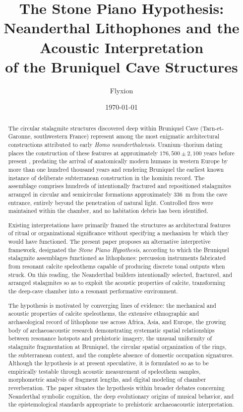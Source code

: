 \documentclass[12pt]{article}
\title{The Stone Piano Hypothesis:\\
Neanderthal Lithophones and the Acoustic Interpretation\\
of the Bruniquel Cave Structures}
\author{Flyxion}
\date{\today}
\begin{document}
\maketitle

\begin{abstract}
The circular stalagmite structures discovered deep within Bruniquel Cave (Tarn-et-Garonne, southwestern France) represent among the most enigmatic architectural constructions attributed to early \textit{Homo neanderthalensis}. Uranium--thorium dating places the construction of these features at approximately $176{,}500 \pm 2{,}100$ years before present \citep{Jaubert2016}, predating the arrival of anatomically modern humans in western Europe by more than one hundred thousand years and rendering Bruniquel the earliest known instance of deliberate subterranean construction in the hominin record. The assemblage comprises hundreds of intentionally fractured and repositioned stalagmites arranged in circular and semicircular formations approximately 336~m from the cave entrance, entirely beyond the penetration of natural light. Controlled fires were maintained within the chamber, and no habitation debris has been identified.

Existing interpretations have primarily framed the structures as architectural features of ritual or organizational significance without specifying a mechanism by which they would have functioned. The present paper proposes an alternative interpretive framework, designated the \textit{Stone Piano Hypothesis}, according to which the Bruniquel stalagmite assemblages functioned as lithophones: percussion instruments fabricated from resonant calcite speleothems capable of producing discrete tonal outputs when struck. On this reading, the Neanderthal builders intentionally selected, fractured, and arranged stalagmites so as to exploit the acoustic properties of calcite, transforming the deep-cave chamber into a resonant performative environment.

The hypothesis is motivated by converging lines of evidence: the mechanical and acoustic properties of calcite speleothems, the extensive ethnographic and archaeological record of lithophone use across Africa, Asia, and Europe, the growing body of archaeoacoustic research demonstrating systematic spatial relationships between resonance hotspots and prehistoric imagery, the unusual uniformity of stalagmite fragmentation at Bruniquel, the circular spatial organization of the rings, the subterranean context, and the complete absence of domestic occupation signatures. Although the hypothesis is at present speculative, it is formulated so as to be empirically testable through acoustic measurement of speleothem samples, morphometric analysis of fragment lengths, and digital modeling of chamber reverberation. The paper situates the hypothesis within broader debates concerning Neanderthal symbolic cognition, the deep evolutionary origins of musical behavior, and the epistemological standards appropriate to prehistoric archaeoacoustic interpretation.
\end{abstract}
\end{document}
